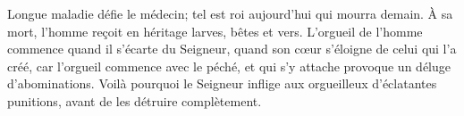 Longue maladie défie le médecin;
	tel est roi aujourd’hui qui mourra demain.
À sa mort, l’homme reçoit en héritage larves, bêtes et vers.
L’orgueil de l’homme commence quand il s’écarte du Seigneur,
	quand son cœur s’éloigne de celui qui l’a créé,
	car l’orgueil commence avec le péché,
	et qui s’y attache provoque un déluge d’abominations.
Voilà pourquoi le Seigneur inflige aux orgueilleux d’éclatantes punitions,
	avant de les détruire complètement.
